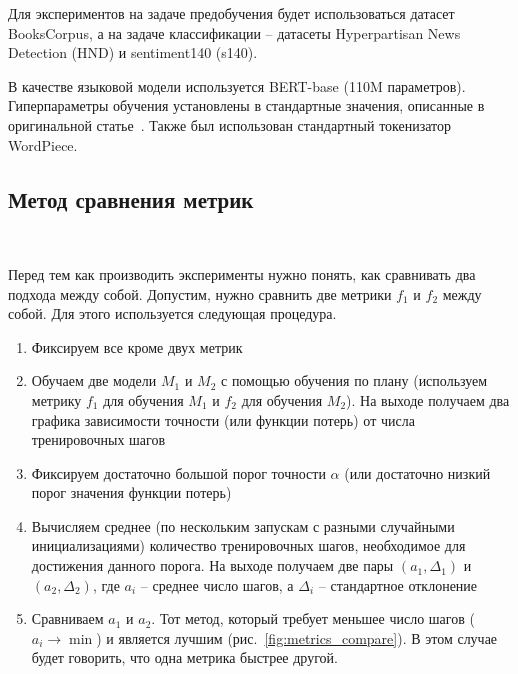 \documentclass{spbau-diploma}
\begin{document}
Для экспериментов на задаче предобучения будет использоваться датасет BooksCorpus, а на задаче классификации -- датасеты Hyperpartisan News Detection (HND) и sentiment140 (s140).

В качестве языковой модели используется BERT-base (110M параметров). Гиперпараметры обучения установлены в стандартные значения, описанные в оригинальной статье~\cite{devlin2018bert}. Также был использован стандартный токенизатор WordPiece.

\subsection{Метод сравнения метрик}
\ 

Перед тем как производить эксперименты нужно понять, как сравнивать два подхода между собой. Допустим, нужно сравнить две метрики $f_1$ и $f_2$ между собой. Для этого используется следующая процедура.

\begin{enumerate}
	\item Фиксируем все кроме двух метрик
	\item Обучаем две модели $M_1$ и $M_2$ с помощью обучения по плану (используем метрику $f_1$ для обучения $M_1$ и $f_2$ для обучения $M_2$). На выходе получаем два графика зависимости точности (или функции потерь) от числа тренировочных шагов
	\item Фиксируем достаточно большой порог точности $\alpha$ (или достаточно низкий порог значения функции потерь)
	\item Вычисляем среднее (по нескольким запускам с разными случайными инициализациями) количество тренировочных шагов, необходимое для достижения данного порога. На выходе получаем две пары $(a_1,\Delta_1)$ и $(a_2,\Delta_2)$, где $a_i$ -- среднее число шагов, а $\Delta_i$ -- стандартное отклонение
	\item Сравниваем $a_1$ и $a_2$. Тот метод, который требует меньшее число шагов ($a_i \rightarrow \min$) и является лучшим (рис.~\ref{fig:metrics_compare}). В этом случае будет говорить, что одна метрика быстрее другой.
\end{enumerate}
\end{document}

